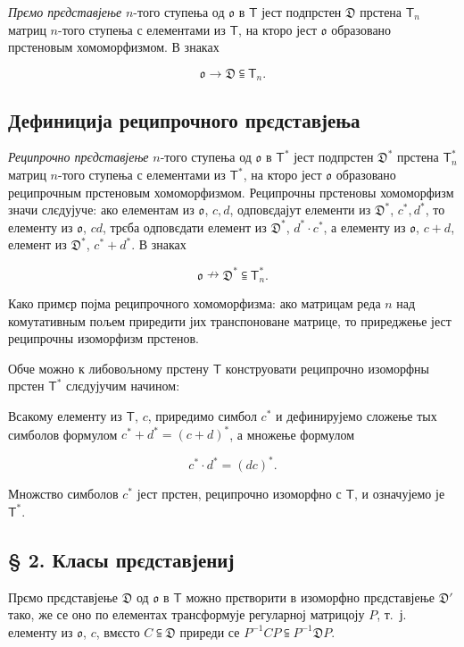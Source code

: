 \documentclass[11pt]{article}
\begin{document}
\emph{Прємо прєдставјење} \(n\)-того ступења од \(\mathfrak{o}\) в \(\mathsf T\) јест подпрстен \(\mathfrak D\) прстена \(\mathsf T_n\) матриц \(n\)-того ступења с елементами из \(\mathsf T\), на кторо јест \(\mathfrak{o}\) образовано прстеновым хомоморфизмом. В знаках

\[
\mathfrak{o}\to\mathfrak D\subseteqq\mathsf T_n.
\]

\subsection*{Дефиниција реципрочного прєдставјења}\label{definition-der-reziproken-darstellung}

\emph{Реципрочно прєдставјење} \(n\)-того ступења од \(\mathfrak{o}\) в \(\mathsf T^*\) јест подпрстен \(\mathfrak D^*\) прстена \(\mathsf T_n^*\) матриц \(n\)-того ступења с елементами из \(\mathsf T^*\), на кторо јест \(\mathfrak{o}\) образовано реципрочным прстеновым хомоморфизмом. Реципрочны прстеновы хомоморфизм значи слєдујуче: ако елементам из \(\mathfrak{o}\), \(c,d\), одповєдајут елементи из \(\mathfrak D^*\), \(c^*,d^*\), то елементу из \(\mathfrak{o}\), \(cd\), трєба одповєдати елемент из \(\mathfrak D^*\), \(d^*\cdot c^*\), а елементу из \(\mathfrak{o}\), \(c+d\), елемент из \(\mathfrak D^*\), \(c^*+d^*\). В знаках

\[
\mathfrak{o}\nrightarrow\mathfrak D^*\subseteqq\mathsf T_n^*.
\]

Како примєр појма реципрочного хомоморфизма: ако матрицам реда \(n\) над комутативным пољем приредити јих транспоноване матрице, то приреджење јест реципрочны изоморфизм прстенов.

Обче можно к либовољному прстену \(\mathsf T\) конструовати реципрочно изоморфны прстен \(\mathsf T^*\) слєдујучим начином:

Всакому елементу из \(\mathsf T\), \(c\), приредимо симбол \(c^*\) и дефинирујемо сложење тых симболов формулом \(c^*+d^*=(c+d)^*\), а множење формулом

\[
c^*\cdot d^*=(dc)^*.
\]

Множство симболов \(c^*\) јест прстен, реципрочно изоморфно с \(\mathsf T\), и означујемо је \(\mathsf T^*\).

\subsection*{§ 2. Класы прєдставјениј}\label{darstellungsklassen}

Прємо прєдставјење \(\mathfrak D\) од \(\mathfrak{o}\) в \(\mathsf T\) можно прєтворити в изоморфно прєдставјење \(\mathfrak D'\) тако, же се оно по елементах трансформује регуларној матрицоју \(P\), т.~ј. елементу из \(\mathfrak{o}\), \(c\), вмєсто \(C\subseteqq\mathfrak D\) приреди се \(P^{-1}CP\subseteqq P^{-1}\mathfrak D P\).
\end{document}
